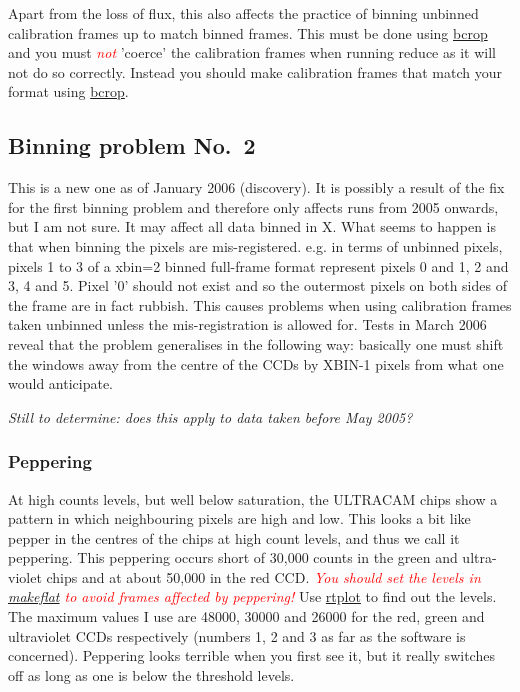 \documentclass[10pt,a4paper,twocolumn]{article}
\newcommand{\main}{http://quetzel.csc.warwick.ac.uk/phsaap/software}
\newcommand{\ultracam}{\main/ultracam/html}
\newcommand{\warn}[1]{\textcolor{red}{\emph{#1}}}
\begin{document}
Apart from the loss of flux, this also affects the practice of binning unbinned
calibration frames up to match binned frames. This must be done using 
\href{\ultracam/bcrop.cc}{bcrop} and you must \warn{not} 'coerce' the
calibration frames when running reduce as it will not do so correctly. Instead
you should make calibration frames that match your format using
\href{\ultracam/bcrop.cc}{bcrop}.

\subsection{Binning problem No.\ 2}
This is a new one as of January 2006 (discovery). It is possibly a
result of the fix for the first binning problem and therefore only
affects runs from 2005 onwards, but I am not sure. It may affect all
data binned in X. What seems to happen is that when binning the pixels
are mis-registered. e.g. in terms of unbinned pixels, pixels 1 to 3 of
a xbin=2 binned full-frame format represent pixels 0 and 1, 2 and 3, 4
and 5. Pixel '0' should not exist and so the outermost pixels on both
sides of the frame are in fact rubbish. This causes problems when
using calibration frames taken unbinned unless the mis-registration is
allowed for.  Tests in March 2006 reveal that the problem generalises
in the following way: basically one must shift the windows away from
the centre of the CCDs by XBIN-1 pixels from what one would
anticipate.

\emph{Still to determine: does this apply to data taken before May
  2005?}

\subsubsection{Peppering}
\label{prob:peppering}
At high counts levels, but well below saturation, the ULTRACAM chips show a
pattern in which neighbouring pixels are high and low.  This looks a bit like
pepper in the centres of the chips at high count levels, and thus we call it
peppering. This peppering occurs short of 30,000 counts in the green and
ultra-violet chips and at about 50,000 in the red CCD. \warn{You should set the
levels in \href{\ultracam/makeflat.html}{makeflat} to avoid frames affected by
peppering!} Use \href{\ultracam/rtplot.html}{rtplot} to find out the levels.
The maximum values I use are 48000, 30000 and 26000 for the red, green and
ultraviolet CCDs respectively (numbers 1, 2 and 3 as far as the software is
concerned). Peppering looks terrible when you first see it, but it really 
switches off as long as one is below the threshold levels.
\end{document}
